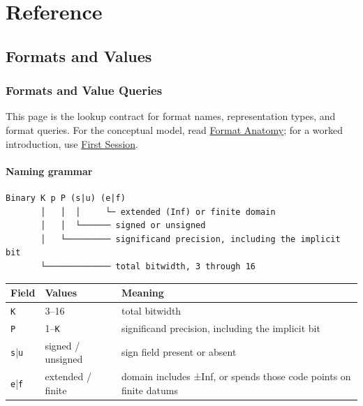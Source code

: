 \part{Reference}


\chapter{Formats and Values}


\section{Formats and Value Queries}



\label{4596305077216184149}{}


This page is the lookup contract for format names, representation types, and format queries. For the conceptual model, read \href{concept\_\allowbreak{}format\_\allowbreak{}anatomy.md}{Format Anatomy}; for a worked introduction, use \href{first\_\allowbreak{}session.md}{First Session}.



\subsection{Naming grammar}



\label{14025844087195034522}{}



\begin{verbatim}
Binary K p P (s|u) (e|f)
       │   │  │     └─ extended (Inf) or finite domain
       │   │  └────── signed or unsigned
       │   └───────── significand precision, including the implicit bit
       └───────────── total bitwidth, 3 through 16
\end{verbatim}




\begin{table}[h]
\centering
\begin{tabulary}{\linewidth}{L L L}
\toprule
Field & Values & Meaning \\
\toprule
\texttt{K} & 3–16 & total bitwidth \\
\texttt{P} & 1–\texttt{K} & significand precision, including the implicit bit \\
\texttt{s}|\texttt{u} & signed / unsigned & sign field present or absent \\
\texttt{e}|\texttt{f} & extended / finite & domain includes ±Inf, or spends those code points on finite datums \\
\bottomrule
\end{tabulary}

\end{table}



